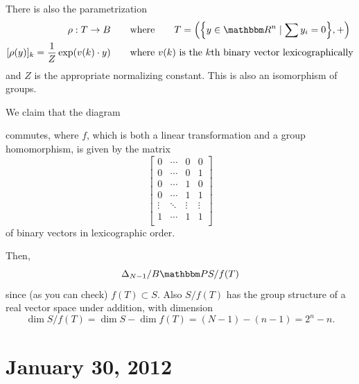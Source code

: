 \documentclass[12pt]{article}
\begin{document}
There is also the parametrization
\begin{align*}
    \rho : T \to B
    &\qquad\text{where}\qquad
    T = \pdel*{\cdel*{y \in \R^n \mid \sum y_i = 0}, +} \\
    [\rho(y)]_k = \frac 1 Z \exp\pdel*{ v(k) \cdot y}
    &\qquad\text{where $v(k)$ is the $k$th binary vector lexicographically}
\end{align*}
and $Z$ is the appropriate normalizing constant.  This is also an isomorphism of
groups.

We claim that the diagram
\begin{center}
\end{center}
commutes, where $f$, which is both a linear transformation and a group
homomorphism, is given by the matrix
\[
    \begin{bmatrix}
        0 & \cdots & 0 & 0 \\
        0 & \cdots & 0 & 1 \\
        0 & \cdots & 1 & 0 \\
        0 & \cdots & 1 & 1 \\
        \vdots  & \ddots & \vdots & \vdots \\
        1 & \cdots & 1 & 1 \\
    \end{bmatrix}
\]
of binary vectors in lexicographic order.

Then,
\[
    \Delta_{N-1} / B \iso S / f(T)
\]
since (as you can check)  $f(T) \subset S$.  Also $S / f(T)$ has the group
structure of a real vector space under addition, with dimension 
\[
    \dim S / f(T) = \dim S - \dim f(T) = (N-1) - (n-1) = 2^n - n.
\]


\section{January 30, 2012}
\end{document}
